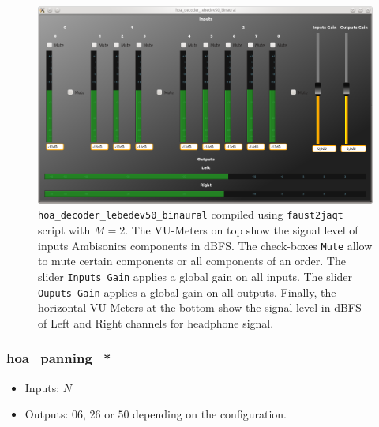 \documentclass[10pt,a4paper]{article}
\begin{document}
\begin{figure}[!ht]
\centering
\includegraphics[width=\columnwidth]{hoa_decoder_lebedev50_binaural.png}
\caption{\lstinline'hoa_decoder_lebedev50_binaural' compiled using \lstinline'faust2jaqt' script with $M=2$. The VU-Meters on top show the signal level of inputs Ambisonics components in dBFS. The check-boxes \lstinline'Mute' allow to mute certain components or all components of an order. The slider \lstinline'Inputs Gain' applies a global gain on all inputs. The slider \lstinline'Ouputs Gain' applies a global gain on all outputs. Finally, the horizontal VU-Meters at the bottom show the signal level in dBFS of Left and Right channels for headphone signal.}
\label{fig:hoa_decoder_lebedev50_binaural}
\end{figure}
\pagebreak

\subsubsection{hoa\_panning\_*}
\label{section:hoa_panning}
\begin{itemize}
\item Inputs: $N$
\item Outputs: $06$, $26$ or $50$ depending on the configuration.
\end{itemize}
\end{document}
